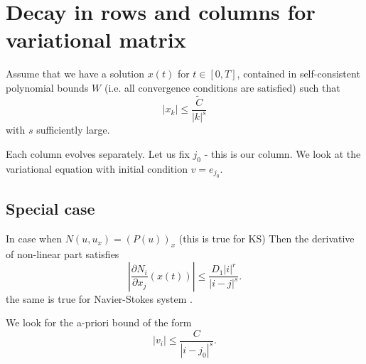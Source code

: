 \section{Decay in rows and columns for variational matrix}


 Assume that we have a solution $x(t)$ for $t \in [0,T]$, contained in self-consistent polynomial bounds $W$ (i.e. all convergence conditions are satisfied) such that
 \begin{equation*}
   |x_k| \leq \frac{\tilde{C}}{|k|^s}
 \end{equation*}
 with $s$ sufficiently large.


Each column evolves separately. Let us fix $j_0$ - this is our column. We look at the variational equation with initial condition $v=e_{j_0}$.


\subsection{Special case}

In case when $N(u,u_x)=(P(u))_x$ (this is true for KS)
 Then the derivative of non-linear part satisfies  
 \begin{equation}
   \left|\frac{\partial N_i}{\partial x_j}(x(t))\right| \leq \frac{D_1 |i|^r}{|i-j|^s}.  \label{eq:estm-DNv}
 \end{equation}
the same is true for Navier-Stokes system \cite{Z}.


We look for the a-priori bound of the form
\begin{equation*}
  |v_i| \leq \frac{C}{|i-j_0|^s}.
\end{equation*}


